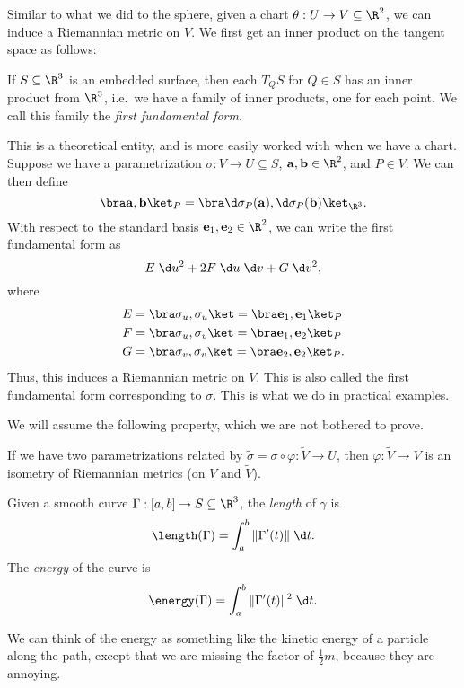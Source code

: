 \documentclass[a4paper]{article}
\begin{document}
Similar to what we did to the sphere, given a chart $\theta: U \to V \subseteq \R^2$, we can induce a Riemannian metric on $V$. We first get an inner product on the tangent space as follows:
\begin{defi}
  If $S \subseteq \R^3$ is an embedded surface, then each $T_Q S$ for $Q \in S$ has an inner product from $\R^3$, i.e.\ we have a family of inner products, one for each point. We call this family the \emph{first fundamental form}.
\end{defi}
This is a theoretical entity, and is more easily worked with when we have a chart. Suppose we have a parametrization $\sigma: V \to U \subseteq S$, $\mathbf{a}, \mathbf{b} \in \R^2$, and $P \in V$. We can then define
\[
  \bra \mathbf{a}, \mathbf{b} \ket_P = \bra \d \sigma_P (\mathbf{a}), \d \sigma_P(\mathbf{b})\ket_{\R^3}.
\]
With respect to the standard basis $\mathbf{e}_1, \mathbf{e}_2 \in \R^2$, we can write the first fundamental form as
\[
  E \;\d u^2 + 2F\;\d u\;\d v + G \;\d v^2,
\]
where
\begin{align*}
  E &= \bra \sigma_u, \sigma_u\ket = \bra \mathbf{e}_1, \mathbf{e}_1\ket_P\\
  F &= \bra \sigma_u, \sigma_v\ket = \bra \mathbf{e}_1, \mathbf{e}_2\ket_P\\
  G &= \bra \sigma_v, \sigma_v\ket = \bra \mathbf{e}_2, \mathbf{e}_2\ket_P.
\end{align*}
Thus, this induces a Riemannian metric on $V$. This is also called the first fundamental form corresponding to $\sigma$. This is what we do in practical examples.

We will assume the following property, which we are not bothered to prove.
\begin{prop}
  If we have two parametrizations related by $\tilde{\sigma} = \sigma \circ \varphi: \tilde{V} \to U$, then $\varphi: \tilde{V} \to V$ is an isometry of Riemannian metrics (on $V$ and $\tilde{V}$).
\end{prop}

\begin{defi}
  Given a smooth curve $\Gamma: [a, b] \to S \subseteq \R^3$, the \emph{length} of $\gamma$ is
  \[
    \length(\Gamma) = \int_a^b \|\Gamma'(t)\| \;\d t.
  \]
  The \emph{energy} of the curve is
  \[
    \energy(\Gamma) = \int_a^b \|\Gamma'(t)\|^2 \;\d t.
  \]
\end{defi}
We can think of the energy as something like the kinetic energy of a particle along the path, except that we are missing the factor of $\frac{1}{2}m$, because they are annoying.
\end{document}
